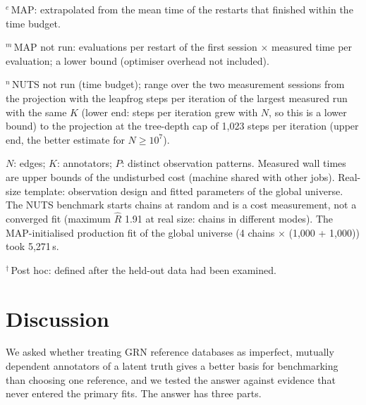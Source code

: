 \documentclass[11pt,a4paper]{article}
\begin{document}
\begin{table}[tbp]
\begin{minipage}{\linewidth}
$^{e}$\,MAP: extrapolated from the mean time of the restarts that finished within the time budget.

$^{m}$\,MAP not run: evaluations per restart of the first session $\times$ measured time per evaluation; a lower bound (optimiser overhead not included).

$^{n}$\,NUTS not run (time budget); range over the two measurement sessions from the projection with the leapfrog steps per iteration of the largest measured run with the same $K$ (lower end: steps per iteration grew with $N$, so this is a lower bound) to the projection at the tree-depth cap of 1{,}023 steps per iteration (upper end, the better estimate for $N \geq 10^7$).

$N$: edges; $K$: annotators; $P$: distinct observation patterns. Measured wall times are upper bounds of the undisturbed cost (machine shared with other jobs). Real-size template: observation design and fitted parameters of the global universe. The NUTS benchmark starts chains at random and is a cost measurement, not a converged fit (maximum $\widehat R$ 1.91 at real size: chains in different modes). The MAP-initialised production fit of the global universe (4 chains $\times$ (1{,}000 + 1{,}000)) took 5{,}271\,s.

$^{\dagger}$\,Post hoc: defined after the held-out data had been examined.
\end{minipage}
\end{table}
\section{Discussion}\label{sec:discussion}

We asked whether treating GRN reference databases as imperfect, mutually dependent annotators of a latent truth gives a better basis for benchmarking than choosing one reference, and we tested the answer against evidence that never entered the primary fits.
The answer has three parts.
\end{document}
